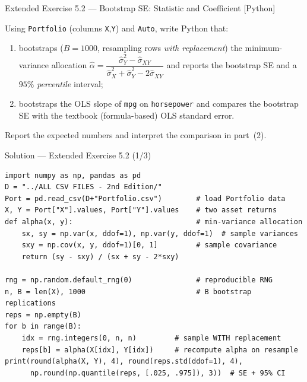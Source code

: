 \documentclass[aspectratio=169,11pt]{beamer}
\begin{document}
\begin{frame}[fragile]{Extended Exercise 5.2 --- Bootstrap SE: Statistic and Coefficient [Python]}
  \begin{longexercise}
    Using \texttt{Portfolio} (columns \texttt{X},\texttt{Y}) and
    \texttt{Auto}, write Python that:
    \begin{enumerate}
      \item bootstraps ($B=1000$, resampling rows \emph{with
            replacement}) the minimum-variance allocation
            $\hat\alpha=\dfrac{\hat\sigma_Y^2-\hat\sigma_{XY}}
            {\hat\sigma_X^2+\hat\sigma_Y^2-2\hat\sigma_{XY}}$
            and reports the bootstrap SE and a $95\%$ \emph{percentile}
            interval;
      \item bootstraps the OLS slope of \texttt{mpg} on
            \texttt{horsepower} and compares the bootstrap SE with the
            textbook (formula-based) OLS standard error.
    \end{enumerate}
    Report the expected numbers and interpret the comparison in part~(2).
  \end{longexercise}
\end{frame}

\begin{frame}[fragile]{Solution --- Extended Exercise 5.2 (1/3)}
  \begin{lstlisting}
import numpy as np, pandas as pd
D = "../ALL CSV FILES - 2nd Edition/"
Port = pd.read_csv(D+"Portfolio.csv")        # load Portfolio data
X, Y = Port["X"].values, Port["Y"].values    # two asset returns
def alpha(x, y):                             # min-variance allocation
    sx, sy = np.var(x, ddof=1), np.var(y, ddof=1)  # sample variances
    sxy = np.cov(x, y, ddof=1)[0, 1]         # sample covariance
    return (sy - sxy) / (sx + sy - 2*sxy)

rng = np.random.default_rng(0)               # reproducible RNG
n, B = len(X), 1000                          # B bootstrap replications
reps = np.empty(B)
for b in range(B):
    idx = rng.integers(0, n, n)         # sample WITH replacement
    reps[b] = alpha(X[idx], Y[idx])     # recompute alpha on resample
print(round(alpha(X, Y), 4), round(reps.std(ddof=1), 4),
      np.round(np.quantile(reps, [.025, .975]), 3))  # SE + 95% CI
  \end{lstlisting}
\end{frame}
\end{document}
